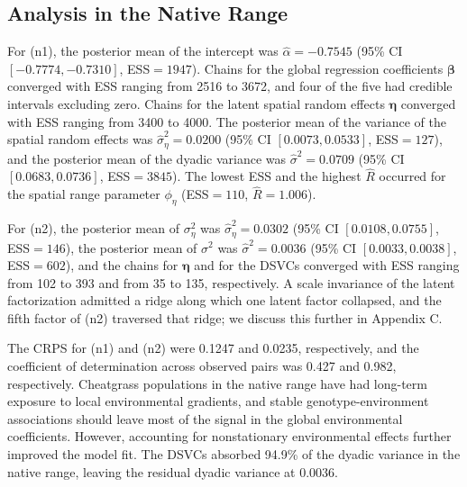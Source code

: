 \documentclass{article}
\begin{document}
\subsection{Analysis in the Native Range}

For (n1), the posterior mean of the intercept was $\hat\alpha=-0.7545$ (95\% CI $[-0.7774,-0.7310]$, ESS$=1947$). Chains for the global regression coefficients $\boldsymbol\beta$ converged with ESS ranging from 2516 to 3672, and four of the five had credible intervals excluding zero. Chains for the latent spatial random effects $\boldsymbol\eta$ converged with ESS ranging from 3400 to 4000. The posterior mean of the variance of the spatial random effects was $\hat\sigma^2_\eta=0.0200$ (95\% CI $[0.0073,0.0533]$, ESS$=127$), and the posterior mean of the dyadic variance was $\hat\sigma^2=0.0709$ (95\% CI $[0.0683,0.0736]$, ESS$=3845$). The lowest ESS and the highest $\hat{R}$ occurred for the spatial range parameter $\phi_\eta$ (ESS$=110$, $\widehat{R}=1.006$).

For (n2), 
the posterior mean of $\sigma^2_\eta$ was $\hat\sigma^2_\eta=0.0302$ (95\% CI $[0.0108,0.0755]$, ESS$=146$), the posterior mean of $\sigma^2$ was $\hat\sigma^2=0.0036$ (95\% CI $[0.0033,0.0038]$, ESS$=602$), and the chains for $\boldsymbol{\eta}$ and for the DSVCs converged with ESS ranging from 102 to 393 and from 35 to 135, respectively.
A scale invariance of the latent factorization admitted a ridge along which one latent factor collapsed, and the fifth factor of (n2) traversed that ridge; we discuss this further in Appendix C.

The CRPS for (n1) and (n2) were 0.1247 and 0.0235, respectively, and the coefficient of determination across observed pairs was 0.427 and 0.982, respectively.
Cheatgrass populations in the native range have had long-term exposure to local environmental gradients, and stable genotype-environment associations should leave most of the signal in the global environmental coefficients. However, accounting for nonstationary environmental effects further improved the model fit. The DSVCs absorbed 94.9\% of the dyadic variance in the native range, leaving the residual dyadic variance at 0.0036.
\end{document}
